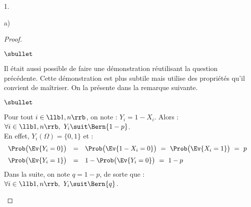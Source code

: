 \begin{noliste}{1.}
\begin{noliste}{a)}
\begin{proof}
\begin{remarkL}{.99}
\begin{noliste}{$\sbullet$}

        \item Il était aussi possible de faire une démonstration
          réutilisant la question précédente. Cette démonstration est
          plus subtile mais utilise des propriétés qu'il convient de
          maîtriser. On la présente dans la remarque suivante.
        \end{noliste}
      \end{remarkL}
      \begin{remarkL}{.99}
        \begin{noliste}{$\sbullet$}
        \item Pour tout $i \in \llb 1, n \rrb$, on note : $Y_i = 1 -
          X_i$. Alors : $\forall i \in \llb 1, n \rrb, \ Y_i \suit
          \Bern{1-p}$.\\[.1cm]
          En effet, $Y_i(\Omega) = \{0, 1\}$ et :
          \[
          \begin{array}{rcl}
            \Prob\big( \Ev{Y_i = 0} \big) & = & \Prob\big( \Ev{1 - X_i = 0}
            \big) \ = \ \Prob\big( \Ev{X_i = 1} \big) \ = \ p
            \\[.2cm]
            \Prob\big( \Ev{Y_i = 1} \big) & = & 1 - \Prob\big( \Ev{Y_i = 0}
            \big) \ = \ 1 - p
          \end{array}
          \]
          Dans la suite, on note $q = 1-p$, de sorte que : $\forall i
          \in \llb 1, n \rrb, \ Y_i \suit \Bern{q}$.


\end{noliste}
\end{remarkL}
\end{proof}
\end{noliste}
\end{noliste}
